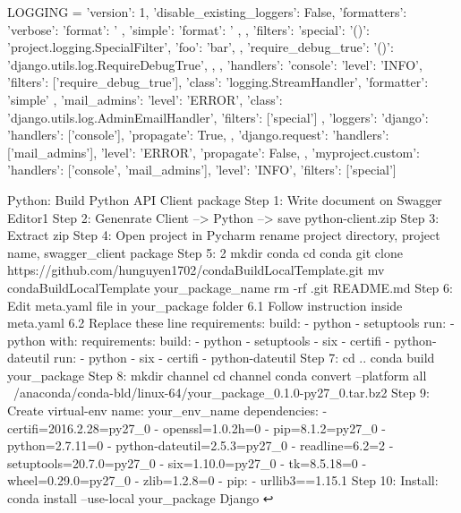 LOGGING = {
    'version': 1,
    'disable_existing_loggers': False,
    'formatters': {
        'verbose': {
            'format': '%
        },
        'simple': {
            'format': '%
        },
    },
    'filters': {
        'special': {
            '()': 'project.logging.SpecialFilter',
            'foo': 'bar',
        },
        'require_debug_true': {
            '()': 'django.utils.log.RequireDebugTrue',
        },
    },
    'handlers': {
        'console': {
            'level': 'INFO',
            'filters': ['require_debug_true'],
            'class': 'logging.StreamHandler',
            'formatter': 'simple'
        },
        'mail_admins': {
            'level': 'ERROR',
            'class': 'django.utils.log.AdminEmailHandler',
            'filters': ['special']
        }
    },
    'loggers': {
        'django': {
            'handlers': ['console'],
            'propagate': True,
        },
        'django.request': {
            'handlers': ['mail_admins'],
            'level': 'ERROR',
            'propagate': False,
        },
        'myproject.custom': {
            'handlers': ['console', 'mail_admins'],
            'level': 'INFO',
            'filters': ['special']
        }
    }
}

Python: Build Python API Client package
Step 1: Write document on Swagger Editor1
Step 2: Genenrate Client --> Python --> save python-client.zip
Step 3: Extract zip
Step 4: Open project in Pycharm rename project directory, project name, swagger_client package
Step 5: 2
mkdir conda
cd conda
git clone https://github.com/hunguyen1702/condaBuildLocalTemplate.git
mv condaBuildLocalTemplate your_package_name
rm -rf .git README.md
Step 6: Edit meta.yaml file in your_package folder
6.1 Follow instruction inside meta.yaml
6.2 Replace these line
requirements:
  build:
    - python
    - setuptools
  run:
    - python
with:
requirements:
  build:
    - python
    - setuptools
    - six
    - certifi
    - python-dateutil
  run:
    - python
    - six
    - certifi
    - python-dateutil
Step 7:
cd ..
conda build your_package
Step 8:
mkdir channel
cd channel
conda convert --platform all ~/anaconda/conda-bld/linux-64/your_package_0.1.0-py27_0.tar.bz2
Step 9: Create virtual-env
name: your_env_name
dependencies:
- certifi=2016.2.28=py27_0
- openssl=1.0.2h=0
- pip=8.1.2=py27_0
- python=2.7.11=0
- python-dateutil=2.5.3=py27_0
- readline=6.2=2
- setuptools=20.7.0=py27_0
- six=1.10.0=py27_0
- tk=8.5.18=0
- wheel=0.29.0=py27_0
- zlib=1.2.8=0
- pip:
  - urllib3==1.15.1
Step 10: Install:
conda install --use-local your_package
Django ↩

